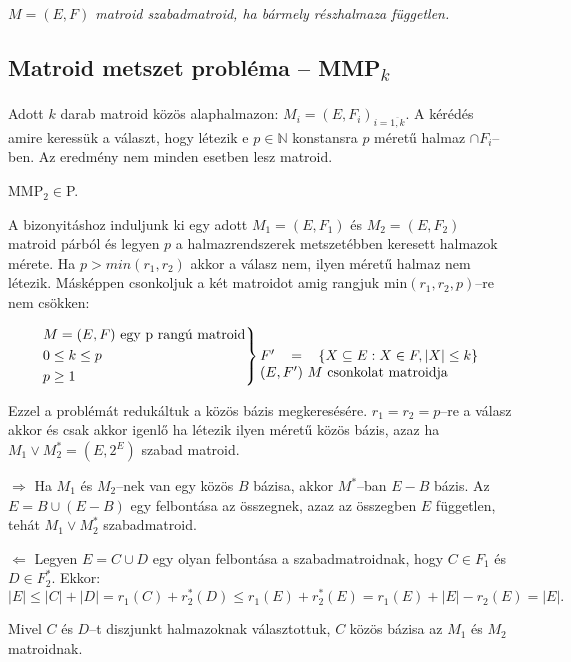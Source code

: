 \vspace{0.4cm}
\emph{$M=(E,F)$ matroid szabadmatroid, ha bármely részhalmaza független.}

\subsection{\texorpdfstring{Matroid metszet probléma -- MMP\textsubscript{$k$}}
	{Matroid metszet probléma -- MMPk}}

Adott $k$ darab matroid közös alaphalmazon: $M_i=(E,F_i)_{i=\overline{1,k}}$. A
kérédés amire keressük a választ, hogy létezik e $p \in \mathbb{N}$ konstansra
$p$ méretű halmaz $\cap F_i$--ben. Az eredmény nem minden esetben lesz matroid.

\vspace{0.4cm}
MMP$_2 \in $P.
\vspace{0.4cm}

A bizonyitáshoz induljunk ki egy adott $M_1=(E,F_1)$ és $M_2=(E,F_2)$ matroid
párból és legyen $p$ a halmazrendszerek metszetébben keresett halmazok mérete.
Ha $p>min(r_1, r_2)$ akkor a válasz nem, ilyen méretű halmaz nem létezik.
Másképpen csonkoljuk a két matroidot amig rangjuk min$(r_1,r_2, p)$--re nem
csökken:

\[ \begin{rcases}
		M=(E,F) \mbox{ egy p rangú matroid} \\
		0 \leq k \leq p                     \\
		p \geq 1
	\end{rcases} \parbox[t]{5.5cm}
	{$F' = \left\{ X \subseteq E: X \in F, |X| \leq k \right\}$
		$(E,F')~M$ csonkolat matroidja} \]

Ezzel a problémát redukáltuk a közös bázis megkeresésére. $r_1=r_2=p$--re a
válasz akkor és csak akkor igenlő ha létezik ilyen méretű közös bázis, azaz ha
$M_1 \vee M_2^*=(E,2^E)$ szabad matroid.

$\Rightarrow$ Ha $M_1$ és $M_2$--nek van egy közös $B$ bázisa, akkor $M^*$--ban
$E-B$ bázis. Az $E=B \cup (E-B)$ egy felbontása az összegnek, azaz az összegben
$E$ független, tehát $M_1 \vee M_2^*$ szabadmatroid.

$\Leftarrow$ Legyen $E=C \cup D$ egy olyan felbontása a szabadmatroidnak, hogy
$C \in F_1$ és $D \in F_2^*$. Ekkor:
\[|E| \leq |C| + |D| = r_1(C) + r_2^*(D) \leq r_1(E)+r_2^*(E) = r_1(E) + |E| - r_2(E)=|E|. \]

Mivel $C$ és $D$--t diszjunkt halmazoknak választottuk, $C$ közös bázisa az $M_1$ és
$M_2$ matroidnak.

